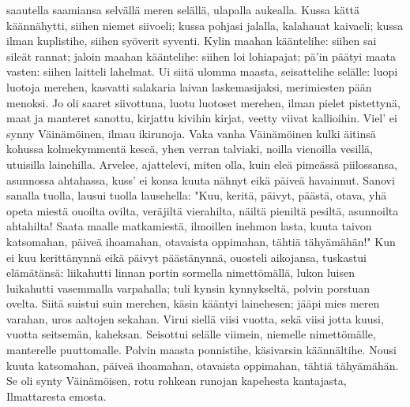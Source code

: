     saautella saamiansa
  \endverse
  \beginverse
    selvällä meren selällä,
    ulapalla aukealla.
    Kussa kättä käännähytti,
    siihen niemet siivoeli;
    kussa pohjasi jalalla,
    kalahauat kaivaeli;
    kussa ilman kuplistihe,
    siihen syöverit syventi.
  \endverse
  \beginverse
    Kylin maahan kääntelihe:
    siihen sai sileät rannat;
  \endverse
  \beginverse
    jaloin maahan kääntelihe:
    siihen loi lohiapajat;
    pä'in päätyi maata vasten:
    siihen laitteli lahelmat.
    Ui siitä ulomma maasta,
    seisattelihe selälle:
    luopi luotoja merehen,
    kasvatti salakaria
    laivan laskemasijaksi,
    merimiesten pään menoksi.
  \endverse
  \beginverse
    Jo oli saaret siivottuna,
    luotu luotoset merehen,
    ilman pielet pistettynä,
    maat ja manteret sanottu,
    kirjattu kivihin kirjat,
    veetty viivat kallioihin.
    Viel' ei synny Väinämöinen,
    ilmau ikirunoja.
    Vaka vanha Väinämöinen
    kulki äitinsä kohussa
  \endverse
  \beginverse
    kolmekymmentä keseä,
    yhen verran talviaki,
    noilla vienoilla vesillä,
    utuisilla lainehilla.
    Arvelee, ajattelevi,
    miten olla, kuin eleä
    pimeässä piilossansa,
    asunnossa ahtahassa,
    kuss' ei konsa kuuta nähnyt
    eikä päiveä havainnut.
  \endverse
  \beginverse
    Sanovi sanalla tuolla,
    lausui tuolla lausehella:
    "Kuu, keritä, päivyt, päästä,
    otava, yhä opeta
    miestä ouoilta ovilta,
    veräjiltä vierahilta,
    näiltä pieniltä pesiltä,
    asunnoilta ahtahilta!
    Saata maalle matkamiestä,
    ilmoillen inehmon lasta,
    kuuta taivon katsomahan,
    päiveä ihoamahan,
    otavaista oppimahan,
    tähtiä tähyämähän!"
    Kun ei kuu kerittänynnä
    eikä päivyt päästänynnä,
    ouosteli aikojansa,
    tuskastui elämätänsä:
    liikahutti linnan portin
    sormella nimettömällä,
  \endverse
  \beginverse
    lukon luisen luikahutti
    vasemmalla varpahalla;
    tuli kynsin kynnykseltä,
    polvin porstuan ovelta.
    Siitä suistui suin merehen,
    käsin kääntyi lainehesen;
    jääpi mies meren varahan,
    uros aaltojen sekahan.
  \endverse
  \beginverse
    Virui siellä viisi vuotta,
    sekä viisi jotta kuusi,
  \endverse
  \beginverse
    vuotta seitsemän, kaheksan.
    Seisottui selälle viimein,
    niemelle nimettömälle,
    manterelle puuttomalle.
    Polvin maasta ponnistihe,
    käsivarsin käännältihe.
    Nousi kuuta katsomahan,
    päiveä ihoamahan,
    otavaista oppimahan,
    tähtiä tähyämähän.
  \endverse
  \beginverse
    Se oli synty Väinämöisen,
    rotu rohkean runojan
    kapehesta kantajasta,
    Ilmattaresta emosta.
  \endverse
\endsong



